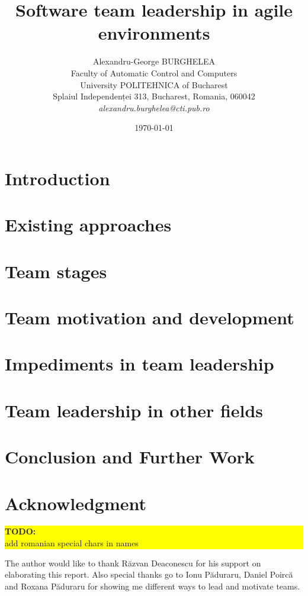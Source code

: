\documentclass[12pt]{article}
\title{Software team leadership in agile environments}
\author{Alexandru-George BURGHELEA\\
Faculty of Automatic Control and Computers\\
University POLITEHNICA of Bucharest\\
Splaiul Independenței 313, Bucharest, Romania, 060042 \\
\emph{alexandru.burghelea@cti.pub.ro}}
\date{\today}
\newcommand{\todo}[1]{
	\colorbox{yellow}{
		\begin{minipage}{15cm}
			\textbf{TODO:}\\
			#1
		\end{minipage}
	}
}
\begin{document}
\maketitle

\begin{abstract}

\end{abstract}

\section{Introduction}
\label{sec:introduction}


\section{Existing approaches}
\label{sec:existingapproaches}


\section{Team stages}
\label{sec:teamstages}


\section{Team motivation and development}
\label{sec:teamdevelopment}


\section{Impediments in team leadership}
\label{sec:impediments}


\section{Team leadership in other fields}
\label{sec:otherfields}


\section{Conclusion and Further Work}
\label{sec:conclusion}


\section*{Acknowledgment}
\label{sec:acknowledgment}
\todo{add romanian special chars in names}

The author would like to thank R\u{a}zvan Deaconescu for his support on elaborating this report. Also special thanks go to Ionu P\u{a}duraru, Daniel Poirc\u{a} and Roxana P\u{a}duraru for showing me different ways to lead and motivate teams.



\end{document}

